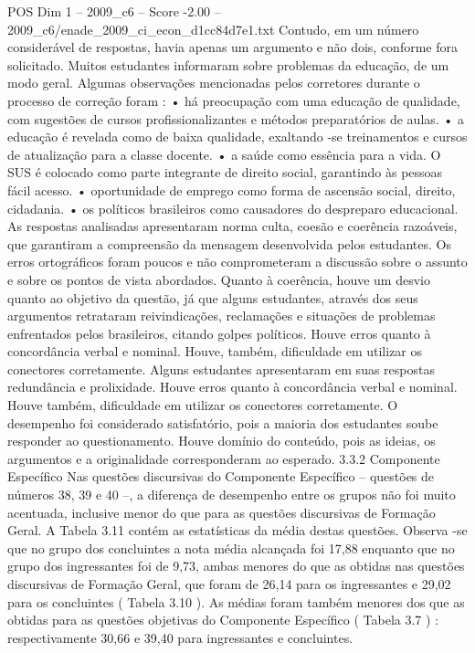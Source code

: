 \begin{textsample}{POS Dim 1 – 2009\_c6 – Score -2.00 – 2009\_c6/enade\_2009\_ci\_econ\_d1cc84d7e1.txt}
Contudo, em um número considerável de respostas, havia apenas um argumento e não dois, conforme fora solicitado.
Muitos estudantes informaram sobre problemas da educação, de um modo geral.
Algumas observações mencionadas pelos corretores durante o processo de correção foram : • há preocupação com uma educação de qualidade, com sugestões de cursos profissionalizantes e métodos preparatórios de aulas. • a educação é revelada como de baixa qualidade, exaltando -se treinamentos e cursos de atualização para a classe docente. • a saúde como essência para a vida.
O SUS é colocado como parte integrante de direito social, garantindo às pessoas fácil acesso. • oportunidade de emprego como forma de ascensão social, direito, cidadania. • os políticos brasileiros como causadores do despreparo educacional.
As respostas analisadas apresentaram norma culta, coesão e coerência razoáveis, que garantiram a compreensão da mensagem desenvolvida pelos estudantes.
Os erros ortográficos foram poucos e não comprometeram a discussão sobre o assunto e sobre os pontos de vista abordados.
Quanto à coerência, houve um desvio quanto ao objetivo da questão, já que alguns estudantes, através dos seus argumentos retrataram reivindicações, reclamações e situações de problemas enfrentados pelos brasileiros, citando golpes políticos.
Houve erros quanto à concordância verbal e nominal.
Houve, também, dificuldade em utilizar os conectores corretamente.
Alguns estudantes apresentaram em suas respostas redundância e prolixidade.
Houve erros quanto à concordância verbal e nominal.
Houve também, dificuldade em utilizar os conectores corretamente.
O desempenho foi considerado satisfatório, pois a maioria dos estudantes soube responder ao questionamento.
Houve domínio do conteúdo, pois as ideias, os argumentos e a originalidade corresponderam ao esperado. 3.3.2 Componente Específico Nas questões discursivas do Componente Específico – questões de números 38, 39 e 40 –, a diferença de desempenho entre os grupos não foi muito acentuada, inclusive menor do que para as questões discursivas de Formação Geral.
A Tabela 3.11 contém as estatísticas da média destas questões.
Observa -se que no grupo dos concluintes a nota média alcançada foi 17,88 enquanto que no grupo dos ingressantes foi de 9,73, ambas menores do que as obtidas nas questões discursivas de Formação Geral, que foram de 26,14 para os ingressantes e 29,02 para os concluintes ( Tabela 3.10 ).
As médias foram também menores dos que as obtidas para as questões objetivas do Componente Específico ( Tabela 3.7 ) : respectivamente 30,66 e 39,40 para ingressantes e concluintes.

\end{textsample}
